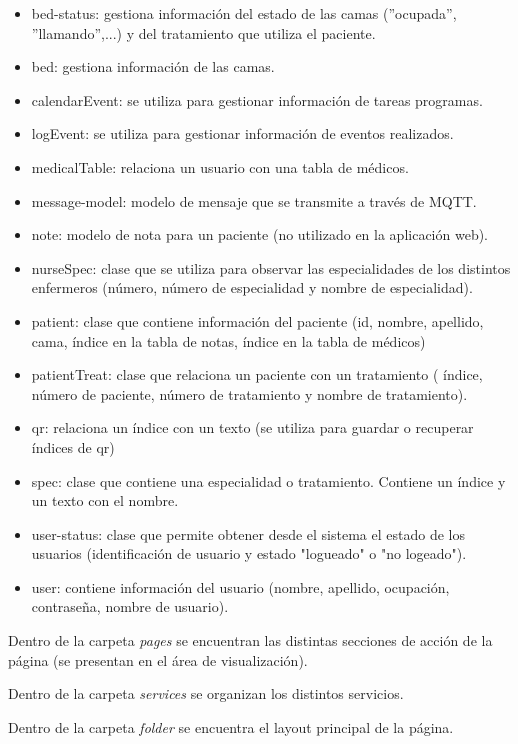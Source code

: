 \begin{itemize}
\item bed-status: gestiona información del estado de las camas  (''ocupada'', ''llamando'',...) y del tratamiento que utiliza el paciente.
\item bed: gestiona información de las camas.
\item calendarEvent: se utiliza para gestionar información de tareas programas.
\item logEvent: se utiliza para gestionar información de eventos realizados.
\item medicalTable: relaciona un usuario con una tabla de médicos.
\item message-model: modelo de mensaje que se transmite a través de MQTT.
\item note: modelo de nota para un paciente (no utilizado en la aplicación web).
\item nurseSpec: clase que se utiliza para observar las especialidades de los distintos enfermeros (número, número de especialidad y nombre de especialidad).
\item patient: clase que contiene información del paciente (id, nombre, apellido, cama, índice en la tabla de notas, índice en la tabla de médicos)
\item patientTreat: clase que relaciona un paciente con un tratamiento ( índice, número de paciente, número de tratamiento y nombre de tratamiento).
\item qr: relaciona un índice con un texto (se utiliza para guardar o recuperar índices de qr)
\item spec: clase que contiene una especialidad o tratamiento. Contiene un índice y un texto con el nombre.
\item user-status: clase que permite obtener desde el sistema el estado de los usuarios (identificación de usuario y estado "logueado" o "no logeado").
\item user: contiene información del usuario (nombre, apellido, ocupación, contraseña, nombre de usuario).
 
\end{itemize}


Dentro de la carpeta \textit{pages} se encuentran las distintas secciones de acción de la página (se presentan en el área de visualización).

Dentro de la carpeta \textit{services} se organizan los distintos servicios.

Dentro de la carpeta \textit{folder} se encuentra el layout principal de la página.

